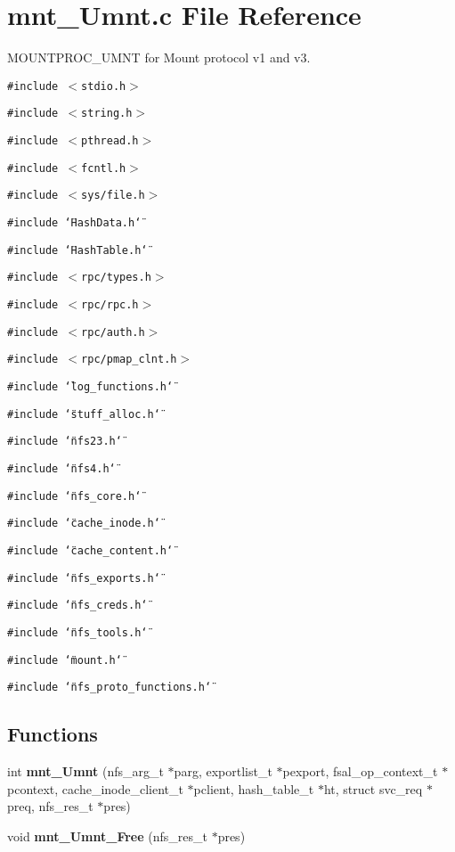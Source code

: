\section{mnt\_\-Umnt.c File Reference}
\label{mnt__Umnt_8c}
MOUNTPROC\_\-UMNT for Mount protocol v1 and v3.  


{\tt \#include $<$stdio.h$>$}\par
{\tt \#include $<$string.h$>$}\par
{\tt \#include $<$pthread.h$>$}\par
{\tt \#include $<$fcntl.h$>$}\par
{\tt \#include $<$sys/file.h$>$}\par
{\tt \#include \char`\"{}HashData.h\char`\"{}}\par
{\tt \#include \char`\"{}HashTable.h\char`\"{}}\par
{\tt \#include $<$rpc/types.h$>$}\par
{\tt \#include $<$rpc/rpc.h$>$}\par
{\tt \#include $<$rpc/auth.h$>$}\par
{\tt \#include $<$rpc/pmap\_\-clnt.h$>$}\par
{\tt \#include \char`\"{}log\_\-functions.h\char`\"{}}\par
{\tt \#include \char`\"{}stuff\_\-alloc.h\char`\"{}}\par
{\tt \#include \char`\"{}nfs23.h\char`\"{}}\par
{\tt \#include \char`\"{}nfs4.h\char`\"{}}\par
{\tt \#include \char`\"{}nfs\_\-core.h\char`\"{}}\par
{\tt \#include \char`\"{}cache\_\-inode.h\char`\"{}}\par
{\tt \#include \char`\"{}cache\_\-content.h\char`\"{}}\par
{\tt \#include \char`\"{}nfs\_\-exports.h\char`\"{}}\par
{\tt \#include \char`\"{}nfs\_\-creds.h\char`\"{}}\par
{\tt \#include \char`\"{}nfs\_\-tools.h\char`\"{}}\par
{\tt \#include \char`\"{}mount.h\char`\"{}}\par
{\tt \#include \char`\"{}nfs\_\-proto\_\-functions.h\char`\"{}}\par
\subsection*{Functions}
\begin{CompactItemize}
\item 
int {\bf mnt\_\-Umnt} (nfs\_\-arg\_\-t $\ast$parg, exportlist\_\-t $\ast$pexport, fsal\_\-op\_\-context\_\-t $\ast$pcontext, cache\_\-inode\_\-client\_\-t $\ast$pclient, hash\_\-table\_\-t $\ast$ht, struct svc\_\-req $\ast$preq, nfs\_\-res\_\-t $\ast$pres)
\item 
void {\bf mnt\_\-Umnt\_\-Free} (nfs\_\-res\_\-t $\ast$pres)
\end{CompactItemize}


